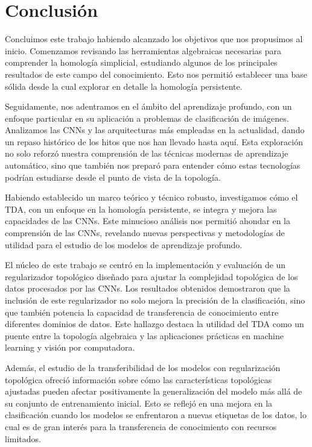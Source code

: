 
\chapter{Conclusión}

Concluimos este trabajo habiendo alcanzado los objetivos que nos propusimos al inicio.
Comenzamos revisando las herramientas algebraicas necesarias para comprender la
homología simplicial, estudiando algunos de los principales resultados de este campo
del conocimiento. Esto nos permitió establecer una base sólida desde la cual
explorar en detalle la homología persistente.

Seguidamente, nos adentramos en el ámbito del aprendizaje profundo, con un
enfoque particular en su aplicación a problemas de clasificación de imágenes. Analizamos
las CNNs y las arquitecturas más empleadas en la actualidad, dando un repaso
histórico de los hitos que nos han llevado hasta aquí. Esta exploración no solo reforzó
nuestra comprensión de las técnicas modernas de aprendizaje automático, sino que
también nos preparó para entender cómo estas tecnologías podrían estudiarse
desde el punto de vista de la topología.

Habiendo establecido un marco teórico y técnico robusto, investigamos cómo el TDA,
con un enfoque en la homología persistente, se integra y mejora las capacidades de
las CNNs. Este minucioso análisis nos permitió ahondar en la comprensión de las
CNNs, revelando nuevas perspectivas y metodologías de utilidad para el estudio de
los modelos de aprendizaje profundo.

El núcleo de este trabajo se centró en la implementación y evaluación de un regularizador
topológico diseñado para ajustar la complejidad topológica de los datos procesados
por las CNNs. Los resultados obtenidos demostraron que la inclusión de este
regularizador no solo mejora la precisión de la clasificación, sino que también potencia
la capacidad de transferencia de conocimiento entre diferentes dominios de datos.
Este hallazgo destaca la utilidad del TDA como un puente entre la topología
algebraica y las aplicaciones prácticas en machine learning y visión por
computadora.

Además, el estudio de la transferibilidad de los modelos con regularización topológica
ofreció información sobre cómo las características topológicas ajustadas pueden afectar
positivamente la generalización del modelo más allá de su conjunto de entrenamiento
inicial. Esto se reflejó en una mejora en la clasificación cuando los modelos se
enfrentaron a nuevas etiquetas de los datos, lo cual es de gran interés para la transferencia
de conocimiento con recursos limitados.


